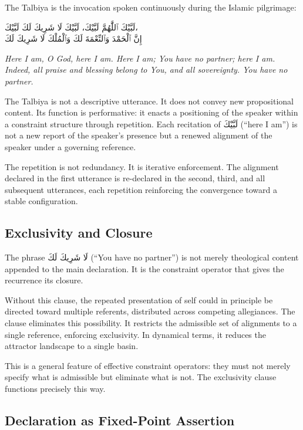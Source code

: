 \documentclass[12pt, oneside]{article}
\newcommand{\AR}[1]{\textarabic{#1}}
\theoremstyle{definition}
\theoremstyle{remark}
\begin{document}
The Talbiya is the invocation spoken continuously during the Islamic pilgrimage:

\begin{center}
\AR{لَبَّيْكَ ٱللَّٰهُمَّ لَبَّيْكَ، لَبَّيْكَ لَا شَرِيكَ لَكَ لَبَّيْكَ،}\\[0.3em]
\AR{إِنَّ ٱلْحَمْدَ وَٱلنِّعْمَةَ لَكَ وَٱلْمُلْكَ لَا شَرِيكَ لَكَ}
\end{center}

\noindent\emph{Here I am, O God, here I am.
Here I am; You have no partner; here I am.
Indeed, all praise and blessing belong to You, and all sovereignty.
You have no partner.}

The Talbiya is not a descriptive utterance.
It does not convey new propositional content.
Its function is performative: it enacts a positioning of the speaker within a constraint structure through repetition.
Each recitation of \AR{لَبَّيْكَ} (``here I am'') is not a new report of the speaker's presence but a renewed alignment of the speaker under a governing reference.

The repetition is not redundancy.
It is iterative enforcement.
The alignment declared in the first utterance is re-declared in the second, third, and all subsequent utterances, each repetition reinforcing the convergence toward a stable configuration.

\subsection{Exclusivity and Closure}

The phrase \AR{لَا شَرِيكَ لَكَ} (``You have no partner'') is not merely theological content appended to the main declaration.
It is the constraint operator that gives the recurrence its closure.

Without this clause, the repeated presentation of self could in principle be directed toward multiple referents, distributed across competing allegiances.
The clause eliminates this possibility.
It restricts the admissible set of alignments to a single reference, enforcing exclusivity.
In dynamical terms, it reduces the attractor landscape to a single basin.

This is a general feature of effective constraint operators: they must not merely specify what is admissible but eliminate what is not.
The exclusivity clause functions precisely this way.

\subsection{Declaration as Fixed-Point Assertion}
\end{document}
